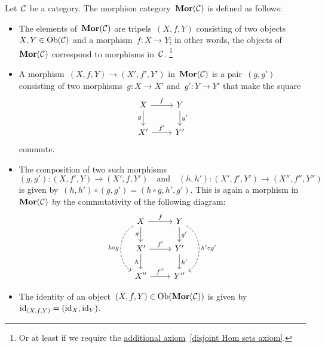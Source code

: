 \begin{example*}
  \label{morphism category}
  Let~$\mathcal{C}$ be a category.
  The morphism category~$\mathbf{Mor}(\mathcal{C})$ is defined as follows:
  \begin{itemize}
    \item 
      The elements of~$\mathbf{Mor}(\mathcal{C})$ are tripels~$(X,f,Y)$ consisting of two objects~$X, Y \in \operatorname{Ob}(\mathcal{C})$ and a morphism~$f \colon X \to Y$;
      in other words, the objects of~$\mathbf{Mor}(\mathcal{C})$ correspond to morphisms in~$\mathcal{C}$.%
      \footnote{Or at least if we require the \hyperref[disjoint Hom sets]{additional axiom}~\ref*{disjoint Hom sets axiom}.}
    \item
      A morphism~$(X, f, Y) \to (X', f', Y')$ in~$\mathbf{Mor}(\mathcal{C})$ is a pair~$(g, g')$ consisting of two morphisms~$g \colon X \to X'$ and~$g' \colon Y \to Y'$ that make the square
      \[
        \begin{tikzcd}
            X
            \arrow{r}[above]{f}
            \arrow{d}[left]{g}
          & Y
            \arrow{d}[right]{g'}
          \\
            X'
            \arrow{r}[above]{f'}
          & Y'
        \end{tikzcd}
      \]
      commute.
    \item
      The composition of two such morphisms
      \[
                (g,g')
        \colon  (X,f',Y)
        \to     (X',f,Y')
        \quad\text{and}\quad
                (h,h')
        \colon  (X',f',Y')
        \to     (X'',f'',Y'')
      \]
      is given by~$(h,h') \circ (g,g') = (h \circ g, h', g')$.
      This is again a morphism in~$\mathbf{Mor}(\mathcal{C})$ by the commutativity of the following diagram:
      \[
        \begin{tikzcd}
            X
            \arrow{r}[above]{f}
            \arrow{d}[left]{g}
            \arrow[dashed, bend right = 60]{dd}[left]{h \circ g}
          & Y
            \arrow{d}[right]{g'}
            \arrow[dashed, bend left = 60]{dd}[right]{h' \circ g'}
          \\
            X'
            \arrow{r}[above]{f'}
            \arrow{d}[left]{h}
          & Y'
            \arrow{d}[right]{h'}
          \\
            X''
            \arrow{r}[above]{f''}
          & Y''
        \end{tikzcd}
      \]
    \item
      The identity of an object~$(X,f,Y) \in \operatorname{Ob}(\mathbf{Mor}(\mathcal{C}))$ is given by~$\operatorname{id}_{(X,f,Y)} = (\operatorname{id}_X, \operatorname{id}_Y)$.
  \end{itemize}
\end{example*}


